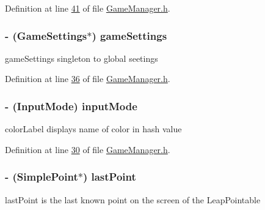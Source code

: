 Definition at line \hyperlink{_game_manager_8h_source_l00041}{41} of file \hyperlink{_game_manager_8h_source}{Game\-Manager.\-h}.

\hypertarget{interface_game_manager_a97ff3b8cd0cbc6baf6f5abe3bb3417ca}{
\subsubsection[{game\-Settings}]{\setlength{\rightskip}{0pt plus 5cm}-\/ ({\bf Game\-Settings}$\ast$) game\-Settings\hspace{0.3cm}{\ttfamily [protected]}}}\label{d4/d94/interface_game_manager_a97ff3b8cd0cbc6baf6f5abe3bb3417ca}
game\-Settings singleton to global seetings 

Definition at line \hyperlink{_game_manager_8h_source_l00036}{36} of file \hyperlink{_game_manager_8h_source}{Game\-Manager.\-h}.

\hypertarget{interface_game_manager_a43f8cf09eea5b0766c73b0d2b258644c}{
\subsubsection[{input\-Mode}]{\setlength{\rightskip}{0pt plus 5cm}-\/ (Input\-Mode) input\-Mode\hspace{0.3cm}{\ttfamily [protected]}}}\label{d4/d94/interface_game_manager_a43f8cf09eea5b0766c73b0d2b258644c}
color\-Label displays name of color in hash value 

Definition at line \hyperlink{_game_manager_8h_source_l00030}{30} of file \hyperlink{_game_manager_8h_source}{Game\-Manager.\-h}.

\hypertarget{interface_game_manager_a4f2a6986ffdbc41d661e90deaee4551a}{
\subsubsection[{last\-Point}]{\setlength{\rightskip}{0pt plus 5cm}-\/ ({\bf Simple\-Point}$\ast$) last\-Point\hspace{0.3cm}{\ttfamily [protected]}}}\label{d4/d94/interface_game_manager_a4f2a6986ffdbc41d661e90deaee4551a}
last\-Point is the last known point on the screen of the Leap\-Pointable 

